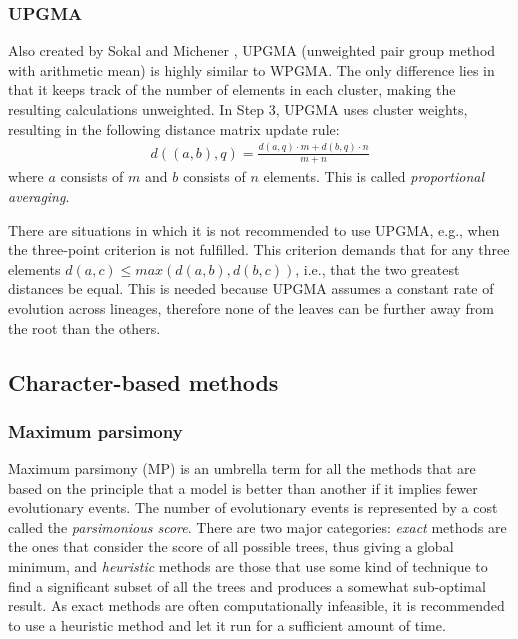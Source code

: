 \documentclass[11pt,twocolumn]{article}
\begin{document}
\subsubsection{UPGMA}

Also created by Sokal and Michener \cite{sokal58}, UPGMA (unweighted pair group method with arithmetic mean) is highly similar to WPGMA. The only difference lies in that it keeps track of the number of elements in each cluster, making the resulting calculations unweighted. In Step 3, UPGMA uses cluster weights, resulting in the following distance matrix update rule:
\begin{align}
d((a, b), q) = \frac{d(a, q) \cdot m + d(b, q) \cdot n}{m + n}
\label{eq:upgma}
\end{align}
where $a$ consists of $m$ and $b$ consists of $n$ elements. This is called \textit{proportional averaging}.

There are situations in which it is not recommended to use UPGMA, e.g., when the three-point criterion is not fulfilled. This criterion demands that for any three elements $d(a, c) \le max(d(a, b), d(b, c))$, i.e., that the two greatest distances be equal. This is needed because UPGMA assumes a constant rate of evolution across lineages, therefore none of the leaves can be further away from the root than the others.

\subsection{Character-based methods}
\subsubsection{Maximum parsimony}

Maximum parsimony (MP) is an umbrella term for all the methods that are based on the principle that a model is better than another if it implies fewer evolutionary events. The number of evolutionary events is represented by a cost called the \textit{parsimonious score}. There are two major categories: \textit{exact} methods are the ones that consider the score of all possible trees, thus giving a global minimum, and \textit{heuristic} methods are those that use some kind of technique to find a significant subset of all the trees and produces a somewhat sub-optimal result. As exact methods are often computationally infeasible, it is recommended to use a heuristic method and let it run for a sufficient amount of time.
\end{document}
